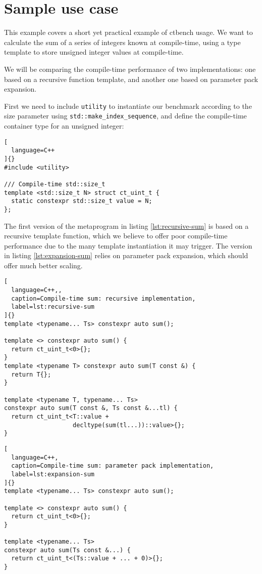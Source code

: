 \documentclass[../main]{subfiles}
\begin{document}
\section{
  Sample use case
}

This example covers a short yet practical example of ctbench usage. We want to
calculate the sum of a series of integers known at compile-time, using a type
template to store unsigned integer values at compile-time.

We will be comparing the compile-time performance of two implementations:
one based on a recursive function template,
and another one based on  parameter pack expansion.

First we need to include \lstinline{utility} to instantiate our benchmark
according to the size parameter using \lstinline{std::make_index_sequence}, and
define the compile-time container type for an unsigned integer:

\begin{lstlisting}[
  language=C++
]{}
#include <utility>

/// Compile-time std::size_t
template <std::size_t N> struct ct_uint_t {
  static constexpr std::size_t value = N;
};
\end{lstlisting}

The first version of the metaprogram in listing \ref{lst:recursive-sum} is based on a recursive template function,
which we believe to offer poor compile-time performance due to the many
template instantiation it may trigger.
The version in listing \ref{lst:expansion-sum} relies on 
parameter pack expansion, which should offer much better scaling.

\begin{lstlisting}[
  language=C++,,
  caption=Compile-time sum: recursive implementation,
  label=lst:recursive-sum
]{}
template <typename... Ts> constexpr auto sum();

template <> constexpr auto sum() {
  return ct_uint_t<0>{};
}
template <typename T> constexpr auto sum(T const &) {
  return T{};
}

template <typename T, typename... Ts>
constexpr auto sum(T const &, Ts const &...tl) {
  return ct_uint_t<T::value +
                   decltype(sum(tl...))::value>{};
}
\end{lstlisting}

\clearpage%

\begin{lstlisting}[
  language=C++,
  caption=Compile-time sum: parameter pack implementation,
  label=lst:expansion-sum
]{}
template <typename... Ts> constexpr auto sum();

template <> constexpr auto sum() {
  return ct_uint_t<0>{};
}

template <typename... Ts>
constexpr auto sum(Ts const &...) {
  return ct_uint_t<(Ts::value + ... + 0)>{};
}

\end{lstlisting}
\end{document}
